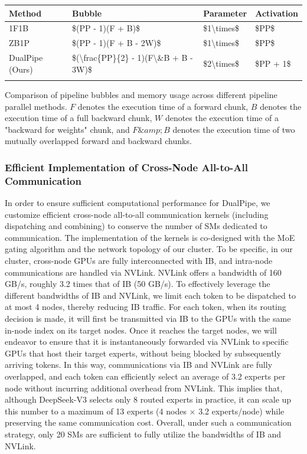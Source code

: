 \documentclass[11pt,a4paper]{article}
\begin{document}
\begin{table}[h]
\begin{tabular}{|l|l|l|l|}
\hline
Method & Bubble & Parameter & Activation \\ \hline
1F1B & \$(PP - 1)(F + B)\$ & \$1\textbackslash{}times\$ & \$PP\$ \\ \hline
ZB1P & \$(PP - 1)(F + B - 2W)\$ & \$1\textbackslash{}times\$ & \$PP\$ \\ \hline
DualPipe (Ours) & \$(\textbackslash{}frac\{PP\}\{2\} - 1)(F\textbackslash{}\&B + B - 3W)\$ & \$2\textbackslash{}times\$ & \$PP + 1\$ \\ \hline
 &  &  &  \\ \hline
\end{tabular}
\end{table}

Comparison of pipeline bubbles and memory usage across different pipeline parallel methods. $F$ denotes the execution time of a forward chunk, $B$ denotes the execution time of a full backward chunk, $W$ denotes the execution time of a "backward for weights" chunk, and $F\&amp;B$ denotes the execution time of two mutually overlapped forward and backward chunks.

\subsubsection{Efficient Implementation of Cross-Node All-to-All Communication}

In order to ensure sufficient computational performance for DualPipe, we customize efficient cross-node all-to-all communication kernels (including dispatching and combining) to conserve the number of SMs dedicated to communication.
The implementation of the kernels is co-designed with the MoE gating algorithm and the network topology of our cluster.
To be specific, in our cluster, cross-node GPUs are fully interconnected with IB, and intra-node communications are handled via NVLink.
NVLink offers a bandwidth of 160 GB/s, roughly 3.2 times that of IB (50 GB/s). 
To effectively leverage the different bandwidths of IB and NVLink, we limit each token to be dispatched to at most 4 nodes, thereby reducing IB traffic.
For each token, when its routing decision is made, it will first be transmitted via IB to the GPUs with the same in-node index on its target nodes. 
Once it reaches the target nodes, we will endeavor to ensure that it is instantaneously forwarded via NVLink to specific GPUs that host their target experts, without being blocked by subsequently arriving tokens.
In this way, communications via IB and NVLink are fully overlapped, and each token can efficiently select an average of 3.2 experts per node without incurring additional overhead from NVLink.
This implies that, although DeepSeek-V3 selects only 8 routed experts in practice, it can scale up this number to a maximum of 13 experts (4 nodes $\times$ 3.2 experts/node) while preserving the same communication cost.
Overall, under such a communication strategy, only 20 SMs are sufficient to fully utilize the bandwidths of IB and NVLink.
\end{document}
